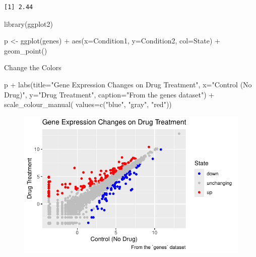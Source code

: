 \documentclass[
  letterpaper,
  DIV=11,
  numbers=noendperiod]{scrartcl}
\newenvironment{Shaded}{\begin{snugshade}}{\end{snugshade}}
\newcommand{\AttributeTok}[1]{\textcolor[rgb]{0.40,0.45,0.13}{#1}}
\newcommand{\FunctionTok}[1]{\textcolor[rgb]{0.28,0.35,0.67}{#1}}
\newcommand{\NormalTok}[1]{\textcolor[rgb]{0.00,0.23,0.31}{#1}}
\newcommand{\OtherTok}[1]{\textcolor[rgb]{0.00,0.23,0.31}{#1}}
\newcommand{\SpecialCharTok}[1]{\textcolor[rgb]{0.37,0.37,0.37}{#1}}
\newcommand{\StringTok}[1]{\textcolor[rgb]{0.13,0.47,0.30}{#1}}
\begin{document}
\begin{verbatim}
[1] 2.44
\end{verbatim}

\begin{Shaded}
\begin{Highlighting}[]
\FunctionTok{library}\NormalTok{(ggplot2)}
\end{Highlighting}
\end{Shaded}

\begin{Shaded}
\begin{Highlighting}[]
\NormalTok{p }\OtherTok{\textless{}{-}} \FunctionTok{ggplot}\NormalTok{(genes) }\SpecialCharTok{+}
  \FunctionTok{aes}\NormalTok{(}\AttributeTok{x=}\NormalTok{Condition1, }\AttributeTok{y=}\NormalTok{Condition2, }\AttributeTok{col=}\NormalTok{State) }\SpecialCharTok{+}
  \FunctionTok{geom\_point}\NormalTok{()}
\end{Highlighting}
\end{Shaded}

Change the Colors

\begin{Shaded}
\begin{Highlighting}[]
\NormalTok{p }\SpecialCharTok{+} \FunctionTok{labs}\NormalTok{(}\AttributeTok{title=}\StringTok{"Gene Expression Changes on Drug Treatment"}\NormalTok{,}
       \AttributeTok{x=}\StringTok{"Control (No Drug)"}\NormalTok{,}
       \AttributeTok{y=}\StringTok{"Drug Treatment"}\NormalTok{,}
       \AttributeTok{caption=}\StringTok{"From the \textasciigrave{}genes\textasciigrave{} dataset"}\NormalTok{) }\SpecialCharTok{+}
       \FunctionTok{scale\_colour\_manual}\NormalTok{( }\AttributeTok{values=}\FunctionTok{c}\NormalTok{(}\StringTok{"blue"}\NormalTok{, }\StringTok{"gray"}\NormalTok{, }\StringTok{"red"}\NormalTok{))}
\end{Highlighting}
\end{Shaded}

\begin{figure}[H]

{\centering \includegraphics{Class05_files/figure-pdf/unnamed-chunk-17-1.pdf}

}

\end{figure}
\end{document}
